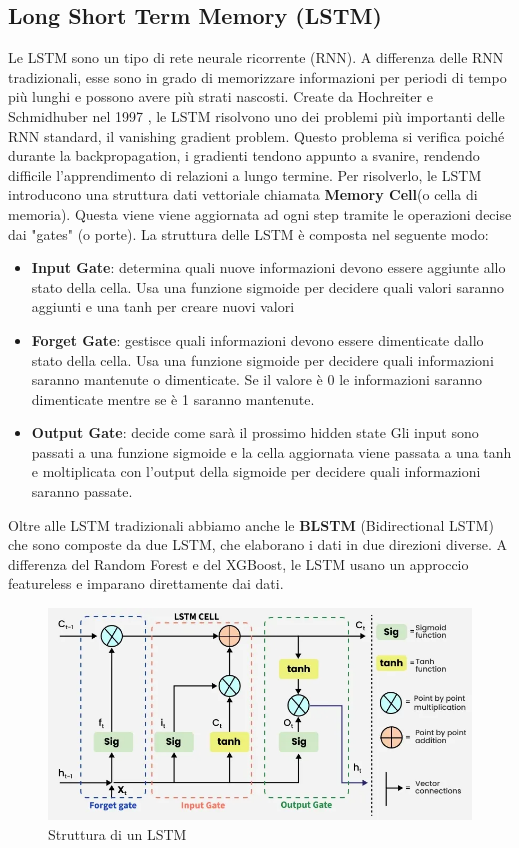 \documentclass[12pt,a4paper,openright,twoside]{book}
\begin{document}
\subsection{Long Short Term Memory (LSTM)}

Le LSTM sono un tipo di rete neurale ricorrente (RNN). 
A differenza delle RNN tradizionali, esse sono in grado di
memorizzare informazioni per periodi di tempo più lunghi e possono
avere più strati nascosti. Create da Hochreiter e Schmidhuber nel 1997 \cite{LSTM1997},
le LSTM risolvono uno dei problemi più importanti
delle RNN standard, il vanishing gradient problem. Questo
problema si verifica poiché durante la backpropagation, i gradienti
tendono appunto a svanire, rendendo difficile l'apprendimento
di relazioni a lungo termine. 
Per risolverlo, le LSTM introducono una struttura dati vettoriale
chiamata \textbf{Memory Cell}(o cella di memoria). Questa viene
viene aggiornata ad ogni step tramite le operazioni decise dai "gates" (o porte).
La struttura delle LSTM è composta nel seguente modo:
\begin{itemize}
    \item \textbf{Input Gate}: determina quali nuove informazioni
    devono essere aggiunte allo stato della cella. Usa una funzione
    sigmoide per decidere quali valori saranno aggiunti e una tanh
    per creare nuovi valori
    \item \textbf{Forget Gate}: gestisce quali informazioni
    devono essere dimenticate dallo stato della cella. Usa una funzione
    sigmoide per decidere quali informazioni saranno mantenute o dimenticate.
    Se il valore è 0 le informazioni saranno dimenticate mentre se è 1 saranno mantenute.
    \item \textbf{Output Gate}: decide come sarà il prossimo hidden state
    Gli input sono passati a una funzione sigmoide e la cella
    aggiornata viene passata a una tanh e moltiplicata con l'output della sigmoide
    per decidere quali informazioni saranno passate.
\end{itemize}

\noindent Oltre alle LSTM tradizionali abbiamo anche le \textbf{BLSTM} (Bidirectional LSTM) che sono
composte da due LSTM, che elaborano i dati in due direzioni diverse.
A differenza del Random Forest e del XGBoost, le LSTM usano un approccio featureless e imparano
direttamente dai dati.

\begin{figure}[H]
    \centering
    \includegraphics[width=.8\linewidth]{figures/gate_of_lstm.png}
    \caption{Struttura di un LSTM \cite{LSTM_image}}
    \label{fig:LSTM}
\end{figure}
\end{document}
